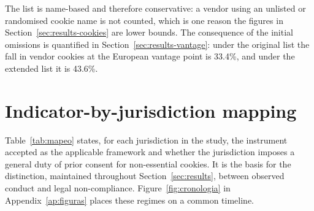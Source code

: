\documentclass[pdflatex,sn-basic,Numbered,iicol]{sn-jnl}
\theoremstyle{thmstyleone}
\theoremstyle{thmstyletwo}
\theoremstyle{thmstylethree}
\begin{document}
\begin{appendices}
The list is name-based and therefore conservative: a vendor using an unlisted or randomised cookie name is not counted, which is one reason the figures in Section~\ref{sec:results-cookies} are lower bounds. The consequence of the initial omissions is quantified in Section~\ref{sec:results-vantage}: under the original list the fall in vendor cookies at the European vantage point is 33.4\%, and under the extended list it is 43.6\%.

\section{Indicator-by-jurisdiction mapping}\label{ap:mapeo}
\setcounter{table}{0}\setcounter{figure}{0}

Table~\ref{tab:mapeo} states, for each jurisdiction in the study, the instrument accepted as the applicable framework and whether the jurisdiction imposes a general duty of prior consent for non-essential cookies. It is the basis for the distinction, maintained throughout Section~\ref{sec:results}, between observed conduct and legal non-compliance. Figure~\ref{fig:cronologia} in Appendix~\ref{ap:figuras} places these regimes on a common timeline.


\end{appendices}
\end{document}
